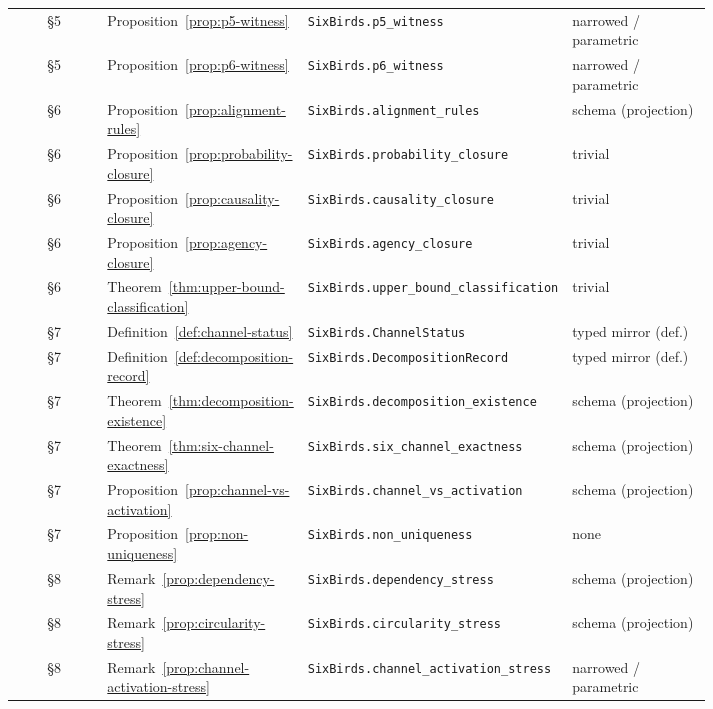 \documentclass[11pt]{article}
\theoremstyle{definition}
\begin{document}
{\begin{longtable}{@{}c >{\raggedright\arraybackslash}p{0.27\linewidth} >{\raggedright\arraybackslash}p{0.34\linewidth} >{\raggedright\arraybackslash}p{0.20\linewidth}@{}}
§5 & Proposition~\ref{prop:p5-witness} & \texttt{SixBirds.\allowbreak p5\_\allowbreak witness} & narrowed / parametric \\
§5 & Proposition~\ref{prop:p6-witness} & \texttt{SixBirds.\allowbreak p6\_\allowbreak witness} & narrowed / parametric \\
§6 & Proposition~\ref{prop:alignment-rules} & \texttt{SixBirds.\allowbreak alignment\_\allowbreak rules} & schema (projection) \\
§6 & Proposition~\ref{prop:probability-closure} & \texttt{SixBirds.\allowbreak probability\_\allowbreak closure} & trivial \\
§6 & Proposition~\ref{prop:causality-closure} & \texttt{SixBirds.\allowbreak causality\_\allowbreak closure} & trivial \\
§6 & Proposition~\ref{prop:agency-closure} & \texttt{SixBirds.\allowbreak agency\_\allowbreak closure} & trivial \\
§6 & Theorem~\ref{thm:upper-bound-classification} & \texttt{SixBirds.\allowbreak upper\_\allowbreak bound\_\allowbreak classification} & trivial \\
§7 & Definition~\ref{def:channel-status} & \texttt{SixBirds.\allowbreak ChannelStatus} & typed mirror (def.) \\
§7 & Definition~\ref{def:decomposition-record} & \texttt{SixBirds.\allowbreak DecompositionRecord} & typed mirror (def.) \\
§7 & Theorem~\ref{thm:decomposition-existence} & \texttt{SixBirds.\allowbreak decomposition\_\allowbreak existence} & schema (projection) \\
§7 & Theorem~\ref{thm:six-channel-exactness} & \texttt{SixBirds.\allowbreak six\_\allowbreak channel\_\allowbreak exactness} & schema (projection) \\
§7 & Proposition~\ref{prop:channel-vs-activation} & \texttt{SixBirds.\allowbreak channel\_\allowbreak vs\_\allowbreak activation} & schema (projection) \\
§7 & Proposition~\ref{prop:non-uniqueness} & \texttt{SixBirds.\allowbreak non\_\allowbreak uniqueness} & none \\
§8 & Remark~\ref{prop:dependency-stress} & \texttt{SixBirds.\allowbreak dependency\_\allowbreak stress} & schema (projection) \\
§8 & Remark~\ref{prop:circularity-stress} & \texttt{SixBirds.\allowbreak circularity\_\allowbreak stress} & schema (projection) \\
§8 & Remark~\ref{prop:channel-activation-stress} & \texttt{SixBirds.\allowbreak channel\_\allowbreak activation\_\allowbreak stress} & narrowed / parametric \\

\end{longtable}}
\end{document}
